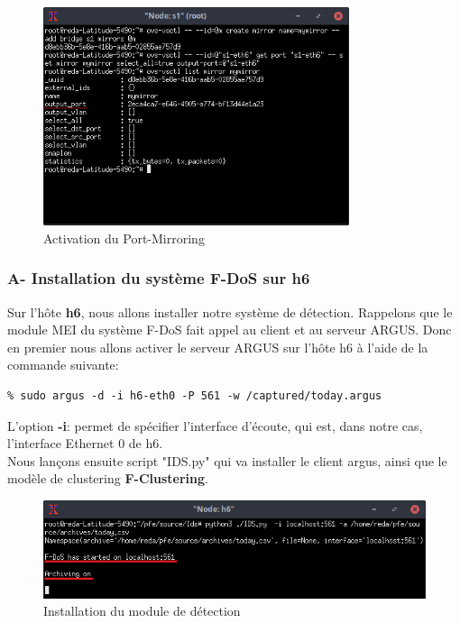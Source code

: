 \begin{figure}[H]
\centering
\includegraphics[width=0.8\textwidth]{Figures/simulation/mininet/switch/create_mirroring_port}
\decoRule
\caption{Activation du Port-Mirroring}
\label{fig:portMirroring}
\end{figure}

\subsubsection{A- Installation du système F-DoS sur h6}
Sur l'hôte \textbf{h6}, nous allons installer notre système de détection. Rappelons que le module MEI du système F-DoS fait appel au client et au serveur ARGUS. Donc en premier nous allons activer le serveur ARGUS sur l'hôte h6 à l'aide de la commande suivante:
\begin{verbatim}
% sudo argus -d -i h6-eth0 -P 561 -w /captured/today.argus
\end{verbatim}
L'option \textbf{-i}: permet de spécifier l'interface d'écoute, qui est, dans notre cas, l'interface Ethernet 0 de h6.\\

\noindent Nous lançons ensuite script "IDS.py" qui va installer le client argus, ainsi que le modèle de clustering \textbf{F-Clustering}.
\begin{figure}[h]
\centering
\includegraphics[width=\textwidth]{Figures/simulation/mininet/IDS/start}
\decoRule
\caption{Installation du module de détection}
\label{fig:fileServer}
\end{figure}
\newpage
